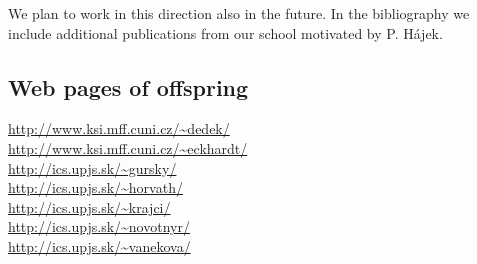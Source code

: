      We plan to work in this direction also in the future.      
     In the bibliography we include additional publications from our school motivated by P. H\'{a}jek. 

\subsection*{Web pages of offspring}

{\small
\noindent\url{http://www.ksi.mff.cuni.cz/~dedek/}
\\\url{http://www.ksi.mff.cuni.cz/~eckhardt/}
\\\url{http://ics.upjs.sk/~gursky/} 
\\\url{http://ics.upjs.sk/~horvath/} 
\\\url{http://ics.upjs.sk/~krajci/}
\\\url{http://ics.upjs.sk/~novotnyr/}
\\\url{http://ics.upjs.sk/~vanekova/}
}



\nocite{1}
\nocite{2}
\nocite{3}
\nocite{4}
\nocite{5}
\nocite{6}
\nocite{7}
\nocite{8}
\nocite{9}
\nocite{10}

\nocite{11}
\nocite{12}
\nocite{13}
\nocite{14}
\nocite{15}
\nocite{16}
\nocite{17}
\nocite{18}
\nocite{19}
\nocite{20}

\nocite{21}
\nocite{22}
\nocite{23}
\nocite{24}
\nocite{25}
\nocite{26}
\nocite{27}
\nocite{28}
\nocite{29}
\nocite{30}

\nocite{31}
\nocite{32}
\nocite{33}
\nocite{34}
\nocite{35}
\nocite{36}
\nocite{37}
\nocite{38}
\nocite{39}
\nocite{40}

\nocite{41}
\nocite{42}
\nocite{43}
\nocite{44}
\nocite{45}
\nocite{46}
\nocite{47}





